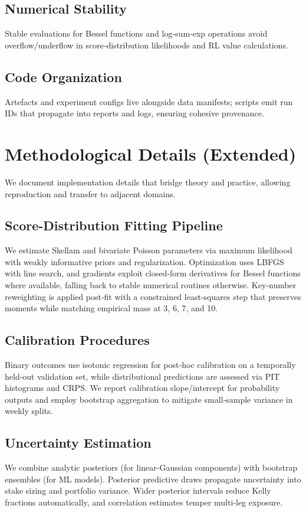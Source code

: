 \documentclass[12pt]{report}  %
\numberwithin{equation}{section}
\theoremstyle{plain}
\theoremstyle{definition}
\theoremstyle{remark}
\begin{document}
\section{Numerical Stability}
Stable evaluations for Bessel functions and log‑sum‑exp operations avoid overflow/underflow in score‑distribution likelihoods and RL value calculations.

\section{Code Organization}
Artefacts and experiment configs live alongside data manifests; scripts emit run IDs that propagate into reports and logs, ensuring cohesive provenance.
\chapter{Methodological Details (Extended)}
We document implementation details that bridge theory and practice, allowing reproduction and transfer to adjacent domains.

\section{Score-Distribution Fitting Pipeline}
We estimate Skellam and bivariate Poisson parameters via maximum likelihood with weakly informative priors and regularization. Optimization uses LBFGS with line search, and gradients exploit closed‑form derivatives for Bessel functions where available, falling back to stable numerical routines otherwise. Key‑number reweighting is applied post‑fit with a constrained least‑squares step that preserves moments while matching empirical mass at 3, 6, 7, and 10.

\section{Calibration Procedures}
Binary outcomes use isotonic regression for post‑hoc calibration on a temporally held‑out validation set, while distributional predictions are assessed via PIT histograms and CRPS. We report calibration slope/intercept for probability outputs and employ bootstrap aggregation to mitigate small‑sample variance in weekly splits.

\section{Uncertainty Estimation}
We combine analytic posteriors (for linear‑Gaussian components) with bootstrap ensembles (for ML models). Posterior predictive draws propagate uncertainty into stake sizing and portfolio variance. Wider posterior intervals reduce Kelly fractions automatically, and correlation estimates temper multi‑leg exposure.
\end{document}
